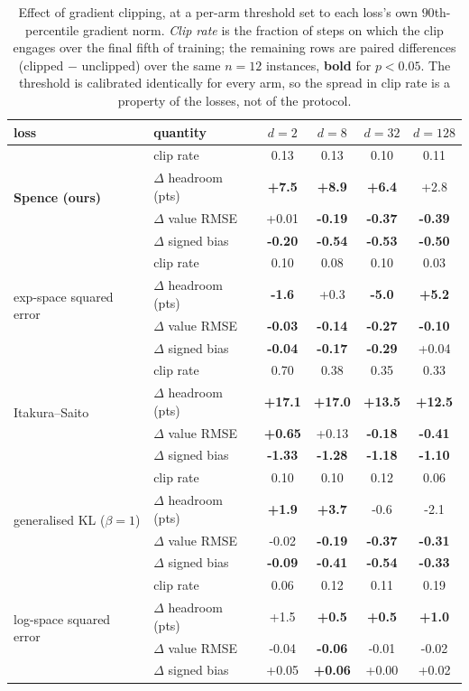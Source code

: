 \begin{table}[t]
\centering\small
\caption{Effect of gradient clipping, at a per-arm threshold set to each
loss's own $90$th-percentile gradient norm. \emph{Clip rate} is the
fraction of steps on which the clip engages over the final fifth of
training; the remaining rows are paired differences (clipped $-$
unclipped) over the same $n=12$ instances, \textbf{bold} for $p<0.05$.
The threshold is calibrated identically for every arm, so the spread in
clip rate is a property of the losses, not of the protocol.}
\label{tab:clip}
\begin{tabular}{llcccc}
\toprule
loss & quantity & $d=2$ & $d=8$ & $d=32$ & $d=128$\\
\midrule
\multirow{4}{*}{\textbf{Spence (ours)}} & clip rate & 0.13 & 0.13 & 0.10 & 0.11\\
 & $\Delta$ headroom (pts) & \textbf{+7.5} & \textbf{+8.9} & \textbf{+6.4} & +2.8\\
 & $\Delta$ value RMSE & +0.01 & \textbf{-0.19} & \textbf{-0.37} & \textbf{-0.39}\\
 & $\Delta$ signed bias & \textbf{-0.20} & \textbf{-0.54} & \textbf{-0.53} & \textbf{-0.50}\\
\midrule
\multirow{4}{*}{exp-space squared error} & clip rate & 0.10 & 0.08 & 0.10 & 0.03\\
 & $\Delta$ headroom (pts) & \textbf{-1.6} & +0.3 & \textbf{-5.0} & \textbf{+5.2}\\
 & $\Delta$ value RMSE & \textbf{-0.03} & \textbf{-0.14} & \textbf{-0.27} & \textbf{-0.10}\\
 & $\Delta$ signed bias & \textbf{-0.04} & \textbf{-0.17} & \textbf{-0.29} & +0.04\\
\midrule
\multirow{4}{*}{Itakura--Saito} & clip rate & 0.70 & 0.38 & 0.35 & 0.33\\
 & $\Delta$ headroom (pts) & \textbf{+17.1} & \textbf{+17.0} & \textbf{+13.5} & \textbf{+12.5}\\
 & $\Delta$ value RMSE & \textbf{+0.65} & +0.13 & \textbf{-0.18} & \textbf{-0.41}\\
 & $\Delta$ signed bias & \textbf{-1.33} & \textbf{-1.28} & \textbf{-1.18} & \textbf{-1.10}\\
\midrule
\multirow{4}{*}{generalised KL ($\beta=1$)} & clip rate & 0.10 & 0.10 & 0.12 & 0.06\\
 & $\Delta$ headroom (pts) & \textbf{+1.9} & \textbf{+3.7} & -0.6 & -2.1\\
 & $\Delta$ value RMSE & -0.02 & \textbf{-0.19} & \textbf{-0.37} & \textbf{-0.31}\\
 & $\Delta$ signed bias & \textbf{-0.09} & \textbf{-0.41} & \textbf{-0.54} & \textbf{-0.33}\\
\midrule
\multirow{4}{*}{log-space squared error} & clip rate & 0.06 & 0.12 & 0.11 & 0.19\\
 & $\Delta$ headroom (pts) & +1.5 & \textbf{+0.5} & \textbf{+0.5} & \textbf{+1.0}\\
 & $\Delta$ value RMSE & -0.04 & \textbf{-0.06} & -0.01 & -0.02\\
 & $\Delta$ signed bias & +0.05 & \textbf{+0.06} & +0.00 & +0.02\\

\bottomrule
\end{tabular}
\end{table}
